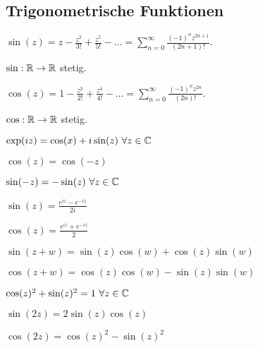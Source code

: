\subsection{Trigonometrische Funktionen}
\begin{compactitem}
    \item $\sin(z) = z - \frac{z^2}{3!} + \frac{z^{5}}{5!} - \dots = \sum_{n=0}^{\infty} \frac{(-1)^n z^{2n + 1}}{(2n + 1)!}$.
        \begin{compactitem}
            \item $\sin: \mathbb{R} \to \mathbb{R}$ stetig.
        \end{compactitem}
    \item $\cos(z) = 1 - \frac{z^2}{2!} + \frac{z^{4}}{4!} - \dots = \sum_{n=0}^{\infty} \frac{(-1)^nz^{2n}}{(2n)!}$.
        \begin{compactitem}
            \item $\cos: \mathbb{R} \to \mathbb{R}$ stetig.
        \end{compactitem}
\end{compactitem}
\begin{compactenum}
    \item $\exp(iz) = \cos(x) + i \sin(z) \ \forall z \in \mathbb{C}$
    \item
        \begin{inparaitem}
            \item $\cos(z) = \cos(-z)$
            \item $\sin(-z) = - \sin(z) \ \forall z \in \mathbb{C}$
        \end{inparaitem}
    \item
        \begin{inparaitem}
            \item $\sin(z) = \frac{e^{iz} - e^{-iz}}{2i}$
            \item $\cos(z) = \frac{e^{iz} + e^{-iz}}{2}$
        \end{inparaitem}
    \item
        \begin{inparaitem}
            \item $\sin(z + w) = \sin(z) \cos(w) + \cos(z) \sin(w)$
            \item $\cos(z + w) = \cos(z) \cos(w) - \sin(z) \sin(w)$
        \end{inparaitem}
    \item $\cos(z)^2 + \sin(z)^2 = 1 \ \forall z \in \mathbb{C}$
    \item
        \begin{inparaitem}
            \item $\sin(2z) = 2 \sin(z) \cos(z)$
            \item $\cos(2z) = \cos(z)^2 - \sin(z)^2$
        \end{inparaitem}
\end{compactenum}

